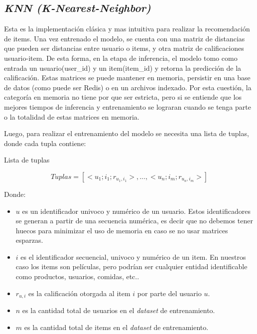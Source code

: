 \documentclass[11pt,a4paper,twoside]{thesis}
\begin{document}
\subsection{\textit{KNN (K-Nearest-Neighbor)}}

Esta es la implementación clásica y mas intuitiva para realizar la recomendación de items. Una vez entrenado el modelo, se cuenta con una matriz de distancias que pueden ser distancias entre usuario o items, y otra matriz de calificaciones usuario-item. De esta forma, en la etapa de inferencia, el modelo tomo como entrada un usuario(user\_id) y un item(item\_id) y retorna la predicción de la calificación. Estas matrices se puede mantener en memoria, persistir en una base de datos (como puede ser Redis) o en un archivos indexado. Por esta cuestión, la categoría en memoria no tiene por que ser estricta, pero si se entiende que los mejores tiempos de inferencia y entrenamiento se lograran cuando se tenga parte o la totalidad de estas matrices en memoria. 

\clearpage
Luego, para realizar el entrenamiento del modelo se necesita una lista de tuplas, donde cada tupla contiene:

\begin{description}
	\item[Lista de tuplas]
\end{description}
\begin{equation}
	Tuplas = [<u_1; i_1; r_{u_1, i_1}>,...,<u_n; i_m; r_{u_n, i_m}>]
\end{equation}
\begin{description}
	\item[Donde:]
\end{description}
\begin{itemize}
	\item $u$ es un identificador univoco y numérico de un usuario. Estos identificadores se generan a partir de una secuencia numérica, es decir que no debemos tener huecos para minimizar el uso de memoria en caso se no usar matrices esparzas. 
	\item $i$ es el identificador secuencial, univoco y numérico de un item. En nuestros caso los items son películas, pero podrían ser cualquier entidad identificable como productos, usuarios, comidas, etc.. 
	\item $r_{u, i}$ es la calificación otorgada al item $i$ por parte del usuario $u$. 
 	\item $n$ es la cantidad total de usuarios en el \textit{dataset} de entrenamiento. 
  	\item $m$ es la cantidad total de items en el \textit{dataset} de entrenamiento. 
\end{itemize}
\end{document}
